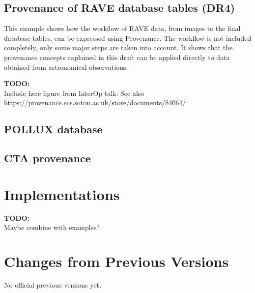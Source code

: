 \documentclass[11pt,a4paper]{ivoa}
\newcommand{\TODO}[1]{%
    \noindent%
    \colorbox{todocolor}{%
            \parbox{0.85\linewidth}{\sffamily \textbf{TODO:}\\
            #1}
    }%
    \vspace{2pt}

}
\begin{document}
\subsection{Provenance of RAVE database tables (DR4)}
This example shows how the workflow of RAVE data, from images to the final database tables, can be expressed using Provenance. 
The workflow is not included completely, only some major steps are taken into account. It shows that the provenance concepts explained in this draft can be applied directly to data obtained from astronomical observations.

\TODO{Include here figure from InterOp talk. See also https://provenance.ecs.soton.ac.uk/store/documents/84064/}

\subsection{POLLUX database}

\subsection{CTA provenance}


\section{Implementations}
\TODO{Maybe combine with examples?}


\appendix
\section{Changes from Previous Versions}
No official previous versions yet.



\end{document}
